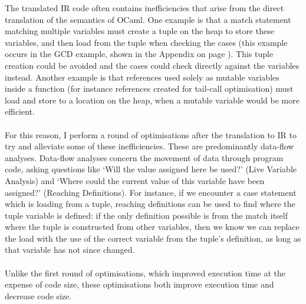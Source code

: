 The translated IR code often contains inefficiencies that arise from the direct translation of the semantics of OCaml. One example is that a match statement matching multiple variables must create a tuple on the heap to store these variables, and then load from the tuple when checking the cases (this example occurs in the GCD example, shown in the Appendix on page \pageref{chapter:gcd}). This tuple creation could be avoided and the cases could check directly against the variables instead. Another example is that references used solely as mutable variables inside a function (for instance references created for tail-call optimisation) must load and store to a location on the heap, when a mutable variable would be more efficient.
\\\\
For this reason, I perform a round of optimisations after the translation to IR to try and alleviate some of these inefficiencies. These are predominantly data-flow analyses. Data-flow analyses concern the movement of data through program code, asking questions like `Will the value assigned here be used?' (Live Variable Analysis) and `Where could the current value of this variable have been assigned?' (Reaching Definitions). For instance, if we encounter a case statement which is loading from a tuple, reaching definitions can be used to find where the tuple variable is defined: if the only definition possible is from the match itself where the tuple is constructed from other variables, then we know we can replace the load with the use of the correct variable from the tuple's definition, as long as that variable has not since changed.
\\\\
Unlike the first round of optimisations, which improved execution time at the expense of code size, these optimisations both improve execution time and decrease code size.


